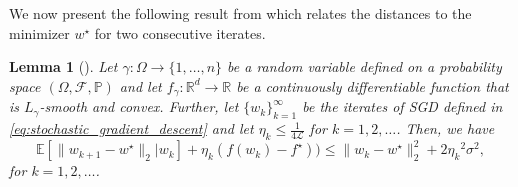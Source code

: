 \documentclass[12pt]{article}
\newtheorem{lemma}[lemma]{Lemma}
\theoremstyle{definition}
\numberwithin{equation}{section}
\newcommand{\R}{\mathbb{R}}
\newcommand{\E}{\mathbb{E}}
\newcommand{\BP}{\mathbb{P}}
\newcommand{\CF}{\mathcal{F}}
\newcommand{\CL}{\mathcal{L}}
\newcommand{\norm}[1]{\lVert{#1}\rVert_2}
\begin{document}
We now present the following result from \autocite{sebbouhAlmostSureConvergence2021} which relates the distances to the minimizer $w^\star$ for two consecutive iterates.
\begin{lemma}[]
  \label{lemma:sgd_iterates}
  Let $\gamma : \Omega \rightarrow \{1,\dots,n\}$ be a random variable defined on a probability space $(\Omega, \CF, \BP)$ and let $f_{\gamma} : \R^d \rightarrow \R$ be a continuously differentiable function that is $L_{\gamma}$-smooth and convex. Further, let $\{w_{k}\}_{k=1}^{\infty}$ be the iterates of SGD defined in \eqref{eq:stochastic_gradient_descent} and let $\eta_k \leq \frac{1}{4 \CL}$ for $k=1,2,\dots$. Then, we have
  \begin{equation*}
    \E[\norm{w_{k+1} - w^\star}|w_k] + \eta_k (f(w_{k}) - f^\star)) \leq \norm{w_{k} - w^\star}^2 + 2{\eta_k}^2\sigma^2,
  \end{equation*}
  for $k=1,2,\dots$.
\end{lemma}
\end{document}
